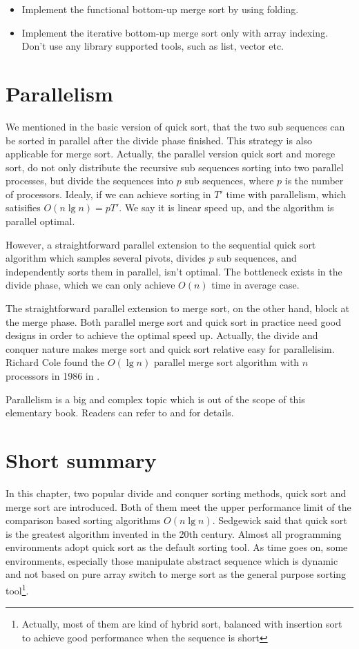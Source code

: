 \documentclass[b5paper]{article}
\begin{document}
\begin{Exercise}
\begin{itemize}
\item Implement the functional bottom-up merge sort by using folding.
\item Implement the iterative bottom-up merge sort only with array indexing. Don't use any library
supported tools, such as list, vector etc.
\end{itemize}
\end{Exercise}

\section{Parallelism}
We mentioned in the basic version of quick sort, that the two sub sequences can be sorted in
parallel after the divide phase finished. This strategy is also applicable for merge sort.
Actually, the parallel version quick sort and morege sort, do not only distribute
the recursive sub sequences sorting into two parallel processes, but divide the sequences into
$p$ sub sequences, where $p$ is the number of processors. Idealy, if we can achieve
sorting in $T'$ time with parallelism, which satisifies $O(n \lg n) = p T'$. We say it
is linear speed up, and the algorithm is parallel optimal.

However, a straightforward parallel extension to the sequential quick sort algorithm
which samples several pivots, divides $p$ sub sequences, and independently
sorts them in parallel, isn't optimal. The bottleneck exists in the
divide phase, which we can only achieve $O(n)$ time in average case.

The straightforward parallel extension to merge sort, on the other hand, block
at the merge phase. Both parallel merge sort and quick sort in practice need
good designs in order to achieve the optimal speed up. Actually, the divide and
conquer nature makes merge sort and quick sort relative easy for parallelisim.
Richard Cole found the $O(\lg n)$ parallel merge sort algorithm with $n$ processors
in 1986 in \cite{para-msort}.

Parallelism is a big and complex
topic which is out of the scope of this elementary book. Readers can refer to
\cite{para-msort} and \cite{para-qsort} for details.

\section{Short summary}
In this chapter, two popular divide and conquer sorting methods, quick sort and merge sort are introduced.
Both of them meet the upper performance limit of the comparison based sorting algorithms $O(n \lg n)$.
Sedgewick said that quick sort is the greatest algorithm invented in the 20th century. Almost
all programming environments adopt quick sort as the default sorting tool. As time goes on,
some environments, especially those manipulate abstract sequence which is dynamic and not based on
pure array switch to merge sort as the general purpose sorting tool\footnote{Actually, most of
them are kind of hybrid sort, balanced with insertion sort to achieve good performance when the
sequence is short}.
\end{document}
